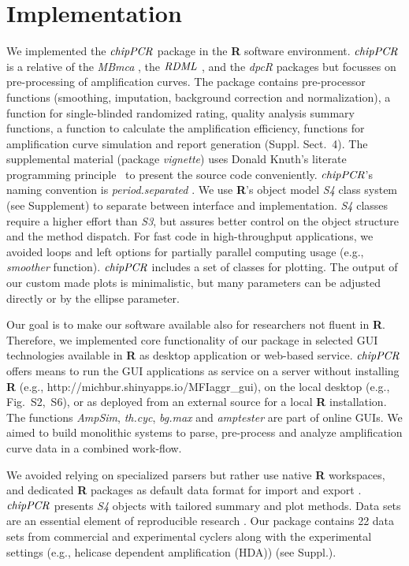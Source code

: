 \documentclass{bioinfo}
\begin{document}
\section{Implementation}
\begin{methods}
We implemented the $\emph{chipPCR}$ package in the \textbf{R} software 
environment. $\emph{chipPCR}$ is a relative of the \emph{MBmca} 
\citep{roediger_RJ_2013}, the $\emph{RDML}$ \citep{blagodatskikh_2014}, and the 
\emph{dpcR} \citep{pabinger_2014} packages but focusses on pre-processing of 
amplification curves. The package contains pre-processor functions (smoothing, 
imputation, background correction and normalization), a function for single-blinded 
randomized rating, quality analysis summary functions, a function to calculate 
the amplification efficiency, functions for amplification curve simulation and 
report 
generation (Suppl. Sect.~4). The supplemental material %
(package \textit{vignette}) uses Donald Knuth's literate programming 
principle~\citep{Knuth1984} to present the source code conveniently. 
$\emph{chipPCR}$'s naming convention is \textit{period.separated} 
\citep{Baaaath_2012}. We use \textbf{R}'s object model \emph{S4} class system 
(see Supplement) to separate between interface and implementation. \emph{S4} 
classes require a higher effort than \emph{S3}, but assures better control on 
the object structure and the method dispatch. For fast code in high-throughput 
applications, we avoided loops and left options for 
partially parallel computing usage (e.g., \textsl{smoother} function). 
$\emph{chipPCR}$ includes a set of classes for plotting. The output of our 
custom made plots is minimalistic, but many parameters can be adjusted directly 
or by the ellipse parameter.

Our goal is to make our software available also for researchers not fluent in 
\textbf{R}. Therefore, we implemented core functionality of our package in 
selected GUI technologies available in \textbf{R} \citep{rodiger_rkward_2012} as 
desktop application or web-based service. $\emph{chipPCR}$ offers means to run 
the GUI applications as service on a server without installing \textbf{R} (e.g., 
http://michbur.shinyapps.io/MFIaggr\_gui), on the local 
desktop (e.g., Fig.~S2,~S6), or as deployed from an external %
source for a local \textbf{R} installation. The functions \textsl{AmpSim}, 
\textsl{th.cyc}, \textsl{bg.max} and \textsl{amptester} are part of online GUIs. 
We aimed to build monolithic systems to parse, pre-process and analyze 
amplification curve data in a combined work-flow. 

We avoided relying on specialized parsers but rather use native \textbf{R} 
workspaces, and dedicated \textbf{R} packages as default data format for import 
and export \citep{perkins_2012,rodiger_rkward_2012,blagodatskikh_2014}. 
$\emph{chipPCR}$ presents \emph{S4} objects with tailored summary and plot 
methods. Data sets are an essential element of reproducible research 
\citep{Leeper_2014}. Our package contains 22 data sets from commercial and 
experimental cyclers along with the experimental settings (e.g., helicase 
dependent amplification (HDA)) (see Suppl.). %
\end{methods}
\end{document}
